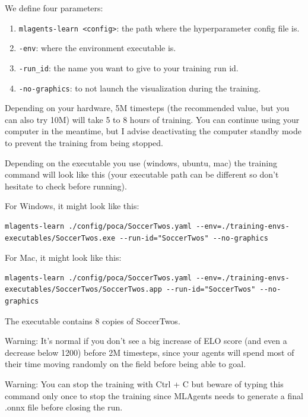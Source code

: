 \documentclass[11pt,a4paper]{article}
\begin{document}
We define four parameters:

\begin{enumerate}
\def\labelenumi{\arabic{enumi}.}
\tightlist
\item
  \texttt{mlagents-learn\ \textless{}config\textgreater{}}: the path where the hyperparameter config file is.
\item
  \texttt{-env}: where the environment executable is.
\item
  \texttt{-run\_id}: the name you want to give to your training run id.
\item
  \texttt{-no-graphics}: to not launch the visualization during the training.
\end{enumerate}

Depending on your hardware, 5M timesteps (the recommended value, but you can also try 10M) will take 5 to 8 hours of training. You can continue using your computer in the meantime, but I advise deactivating the computer standby mode to prevent the training from being stopped.

Depending on the executable you use (windows, ubuntu, mac) the training command will look like this (your executable path can be different so don't hesitate to check before running).

For Windows, it might look like this:

\begin{lstlisting}
mlagents-learn ./config/poca/SoccerTwos.yaml --env=./training-envs-executables/SoccerTwos.exe --run-id="SoccerTwos" --no-graphics
\end{lstlisting}

For Mac, it might look like this:

\begin{lstlisting}
mlagents-learn ./config/poca/SoccerTwos.yaml --env=./training-envs-executables/SoccerTwos/SoccerTwos.app --run-id="SoccerTwos" --no-graphics
\end{lstlisting}

The executable contains 8 copies of SoccerTwos.

Warning: It's normal if you don't see a big increase of ELO score (and even a decrease below 1200) before 2M timesteps, since your agents will spend most of their time moving randomly on the field before being able to goal.

Warning: You can stop the training with Ctrl + C but beware of typing this command only once to stop the training since MLAgents needs to generate a final .onnx file before closing the run.
\end{document}
